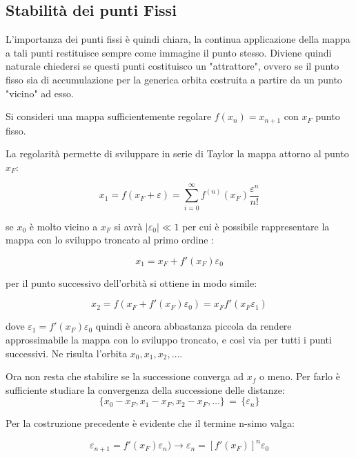 \documentclass[13pt]{article}
\begin{document}
\subsection{Stabilità dei punti Fissi}

L'importanza dei punti fissi è quindi chiara, la continua applicazione della mappa a tali punti restituisce sempre come immagine il punto stesso. Diviene quindi naturale chiedersi se questi punti costituisco un "attrattore", ovvero se il punto fisso sia di accumulazione per la generica orbita costruita a partire da un punto "vicino" ad esso.

Si consideri una mappa sufficientemente regolare $ f(x_{n}) = x_{n+1}$ con $x_{F}$ punto fisso.

La regolarità permette di sviluppare in serie di Taylor la mappa attorno al punto $x_{F}$:

	\begin{equation}
		x_{1} = f(x_{F} + \varepsilon) =  \sum_{i = 0}^{\infty} f^{(n)}(x_{F}) \dfrac{\varepsilon^{n}}{n!}
	\end{equation}

se $x_{0}$ è molto vicino a $x_{F}$ si avrà $\mid \varepsilon_{0} \mid \ll 1$ per cui è possibile rappresentare la mappa con lo sviluppo troncato al primo ordine :

	\begin{equation}
		x_{1} = x_{F} + f'(x_{F})\varepsilon_{0}
	\end{equation}

per il punto successivo dell'orbità si ottiene in modo simile:

	\begin{equation}
		x_{2} =f(x_{F} + f'(x_{F})\varepsilon_{0}) = x_{F} f'(x_{F}\varepsilon_{1})
	\end{equation}

dove $\varepsilon_{1} = f'(x_{F})\varepsilon_{0}$ quindi è ancora abbastanza piccola da rendere approssimabile la mappa con lo sviluppo troncato, e così via per tutti i punti successivi.
Ne risulta l'orbita ${x_{0}, x_{1}, x_{2}, \ldots}$.

Ora non resta che stabilire se la successione converga ad $x_{f}$ o meno.
Per farlo è sufficiente studiare la convergenza della successione delle distanze: $$\{x_{0} - x_{F}, x_{1} - x_{F}, x_{2} - x_{F}, \ldots\} \, = \, \{\varepsilon_{n}\} $$

Per la costruzione precedente è evidente che il termine n-simo valga:

	\begin{equation}
		\varepsilon_{n+1} =f'(x_{F})\varepsilon_{n}) \longrightarrow \varepsilon_{n} = [ f'(x_{F}) ]^{n} \varepsilon_{0}
	\end{equation}
\end{document}
